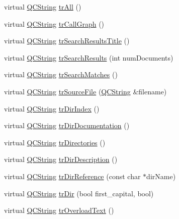 \begin{DoxyCompactItemize}
\item 
virtual \hyperlink{class_q_c_string}{Q\-C\-String} \hyperlink{class_translator_italian_afba06c0d2fb2ce2775c541d44b805758}{tr\-All} ()
\item 
virtual \hyperlink{class_q_c_string}{Q\-C\-String} \hyperlink{class_translator_italian_a5eb7947fa59555756d25476f922cde01}{tr\-Call\-Graph} ()
\item 
virtual \hyperlink{class_q_c_string}{Q\-C\-String} \hyperlink{class_translator_italian_a711c6a2b5461f1f055d00611ea3a0533}{tr\-Search\-Results\-Title} ()
\item 
virtual \hyperlink{class_q_c_string}{Q\-C\-String} \hyperlink{class_translator_italian_ae43fbd8a6b08b331a6586422bd8c465e}{tr\-Search\-Results} (int num\-Documents)
\item 
virtual \hyperlink{class_q_c_string}{Q\-C\-String} \hyperlink{class_translator_italian_a0677855fd52afcda6d47b2cc51e7de31}{tr\-Search\-Matches} ()
\item 
virtual \hyperlink{class_q_c_string}{Q\-C\-String} \hyperlink{class_translator_italian_a1b3571c6c75d16ebe3763f510bd95b68}{tr\-Source\-File} (\hyperlink{class_q_c_string}{Q\-C\-String} \&filename)
\item 
virtual \hyperlink{class_q_c_string}{Q\-C\-String} \hyperlink{class_translator_italian_ae9895001e5d8629fd068895b2ffa653f}{tr\-Dir\-Index} ()
\item 
virtual \hyperlink{class_q_c_string}{Q\-C\-String} \hyperlink{class_translator_italian_a89a223d69d1255271719c256b2fd451b}{tr\-Dir\-Documentation} ()
\item 
virtual \hyperlink{class_q_c_string}{Q\-C\-String} \hyperlink{class_translator_italian_ab7610b46aedb923a1524272dfbaeab38}{tr\-Directories} ()
\item 
virtual \hyperlink{class_q_c_string}{Q\-C\-String} \hyperlink{class_translator_italian_abf769d2a217fcf6b9d3b9170fbbae7c8}{tr\-Dir\-Description} ()
\item 
virtual \hyperlink{class_q_c_string}{Q\-C\-String} \hyperlink{class_translator_italian_ae680136bec0ce1d29a1e4e00d871797f}{tr\-Dir\-Reference} (const char $\ast$dir\-Name)
\item 
virtual \hyperlink{class_q_c_string}{Q\-C\-String} \hyperlink{class_translator_italian_abd733765f737e1f4d5d60e55f0907e72}{tr\-Dir} (bool first\-\_\-capital, bool)
\item 
virtual \hyperlink{class_q_c_string}{Q\-C\-String} \hyperlink{class_translator_italian_ac5436cb286c48cd540d0cdce200a82b9}{tr\-Overload\-Text} ()

\end{DoxyCompactItemize}
